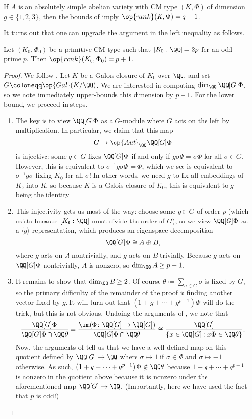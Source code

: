 \documentclass{article}
\begin{document}
\begin{example}
	If $A$ is an absolutely simple abelian variety with CM type $(K,\Phi)$ of dimension $g\in\{1,2,3\}$, then the bounds of  imply $\op{rank}(K,\Phi)=g+1$.
\end{example}
It turns out that one can upgrade the argument in the left inequality as follows.
\begin{proposition}
	Let $(K_0,\Phi_0)$ be a primitive CM type such that $[K_0:\QQ]=2p$ for an odd prime $p$. Then $\op{rank}(K_0,\Phi_0)=p+1$.
\end{proposition}
\begin{proof}
	We follow \cite[Theorem~2]{ribet-mt-av}. Let $K$ be a Galois closure of $K_0$ over $\QQ$, and set $G\coloneqq\op{Gal}(K/\QQ)$. We are interested in computing $\dim_\QQ\QQ[G]\Phi$, so we note  immediately upper-bounds this dimension by $p+1$. For the lower bound, we proceed in steps.
	\begin{enumerate}
		\item The key is to view $\QQ[G]\Phi$ as a $G$-module where $G$ acts on the left by multiplication. In particular, we claim that this map
		\[G\to\op{Aut}_\QQ\QQ[G]\Phi\]
		is injective: some $g\in G$ fixes $\QQ[G]\Phi$ if and only if $g\sigma\Phi=\sigma\Phi$ for all $\sigma\in G$. However, this is equivalent to $\sigma^{-1}g\sigma\Phi=\Phi$, which we see is equivalent to $\sigma^{-1}g\sigma$ fixing $K_0$ for all $\sigma$! In other words, we need $g$ to fix all embeddings of $K_0$ into $K$, so because $K$ is a Galois closure of $K_0$, this is equivalent to $g$ being the identity.

		\item This injectivity gets us most of the way: choose some $g\in G$ of order $p$ (which exists because $[K_0:\QQ]$ must divide the order of $G$), so we view $\QQ[G]\Phi$ as a $\langle g\rangle$-representation, which produces an eigenspace decomposition
		\[\QQ[G]\Phi\cong A\oplus B,\]
		where $g$ acts on $A$ nontrivially, and $g$ acts on $B$ trivially. Because $g$ acts on $\QQ[G]\Phi$ nontrivially, $A$ is nonzero, so $\dim_\QQ A\ge p-1$.

		\item It remains to show that $\dim_\QQ B\ge2$. Of course $\theta\coloneqq\sum_{\sigma\in G}\sigma$ is fixed by $G$, so the primary difficulty of the remainder of the proof is finding another vector fixed by $g$. It will turn out that $\left(1+g+\cdots+g^{p-1}\right)\Phi$ will do the trick, but this is not obvious. Undoing the arguments of , we note that
		\[\frac{\QQ[G]\Phi}{\QQ[G]\Phi\cap\QQ\theta}=\frac{\im(\Phi\colon\QQ[G]\to\QQ[G])}{\QQ[G]\Phi\cap\QQ\theta}\cong\frac{\QQ[G]}{\{x\in\QQ[G]:x\Phi\in\QQ\theta\}}.\]
		Now, the arguments of  tell us that we have a well-defined map on this quotient defined by $\QQ[G]\to\QQ$ where $\sigma\mapsto1$ if $\sigma\in\Phi$ and $\sigma\mapsto-1$ otherwise. As such, $\left(1+g+\cdots+g^{p-1}\right)\Phi\notin\QQ\theta$ because $1+g+\cdots+g^{p-1}$ is nonzero in the quotient above because it is nonzero under the aforementioned map $\QQ[G]\to\QQ$. (Importantly, here we have used the fact that $p$ is odd!)
		\qedhere
	\end{enumerate}
\end{proof}
\end{document}
